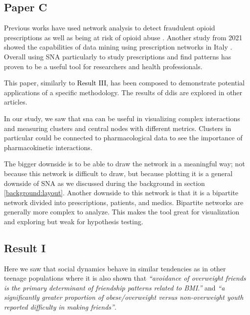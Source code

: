 \subsection{Paper C}


Previous works have used network analysis to detect fraudulent opioid prescriptions \cite{Perry2019} as well as being at risk of opioid abuse \cite{Rice2012}. Another study from 2021 showed the capabilities of data mining using prescription networks in Italy \cite{Miglio2021}. Overall using SNA particularly to study prescriptions and find patterns has proven to be a useful tool for researchers and health professionals.


This paper, similarly to \colorbox{ResultColor}{\textcolor{black}{Result III}}, has been composed to demonstrate potential applications of a specific methodology. The results of \gls{ddis} are explored in other articles.


In our study, we saw that \gls{sna} can be useful in visualizing complex interactions and measuring clusters and central nodes with different metrics. Clusters in particular could be connected to pharmacological data to see the importance of pharmacokinetic interactions.


The bigger downside is to be able to draw the network in a meaningful way; not because this network is difficult to draw, but because plotting it is a general downside of SNA as we discussed during the background in section \ref{background:layout}. Another downside to this network is that it is a bipartite network divided into prescriptions, patients, and medics. Bipartite networks are generally more complex to analyze. This makes the tool great for visualization and exploring but weak for hypothesis testing.

\subsection{Result I}


Here we saw that social dynamics behave in similar tendencies as in other teenage populations \cite{Zhang2015, Schaefer2014, Fonseca2005, Valente2009, delaHaye2011} where it is also shown that \textit{“avoidance of overweight friends is the primary determinant of friendship patterns related to BMI.”} and \textit{“a significantly greater proportion of obese/overweight versus non-overweight youth reported difficulty in making friends”}. 

